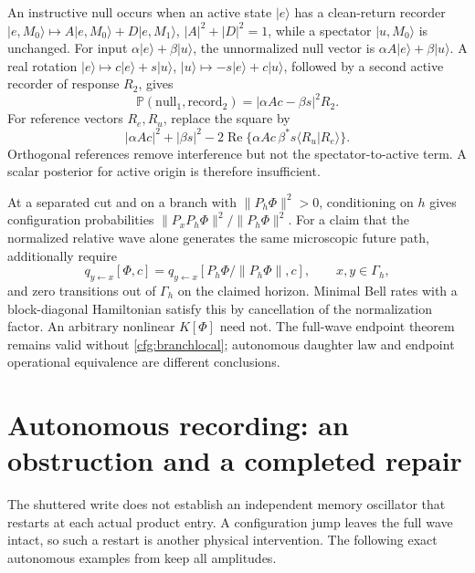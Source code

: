 \documentclass[11pt,oneside,openany]{book}
\theoremstyle{definition}
\theoremstyle{remark}\newtheorem{remark}[theorem]{Remark}
\begin{document}
An instructive null occurs when an active state $|e\rangle$ has a
clean-return recorder
$|e,M_0\rangle\mapsto A|e,M_0\rangle+D|e,M_1\rangle$,
$|A|^2+|D|^2=1$, while a spectator $|u,M_0\rangle$ is unchanged.
For input $\alpha|e\rangle+\beta|u\rangle$, the unnormalized null vector is
$\alpha A|e\rangle+\beta|u\rangle$. A real rotation
$|e\rangle\mapsto c|e\rangle+s|u\rangle$,
$|u\rangle\mapsto-s|e\rangle+c|u\rangle$, followed by a second
active recorder of response $R_2$, gives
\[
 \mathbb P(\mathrm{null}_1,\mathrm{record}_2)
       =|\alpha Ac-\beta s|^2 R_2.
\]
For reference vectors $R_e,R_u$, replace the square by
\[
 |\alpha Ac|^2+|\beta s|^2
 -2\operatorname{Re}\{\alpha Ac\,\beta^*s
                   \langle R_u|R_e\rangle\}.
\]
Orthogonal references remove interference but not the spectator-to-active
term. A scalar posterior for active origin is therefore insufficient.

At a separated cut and on a branch with $\|P_h\Phi\|^2>0$, conditioning on $h$ gives configuration probabilities
$\|P_xP_h\Phi\|^2/\|P_h\Phi\|^2$. For a claim that the normalized relative
wave alone generates the same microscopic future path, additionally require
\begin{equation}
 q_{y\leftarrow x}[\Phi,c]
   =q_{y\leftarrow x}[P_h\Phi/\|P_h\Phi\|,c],
 \qquad x,y\in\Gamma_h,
 \label{cfg:branchlocal}
\end{equation}
and zero transitions out of $\Gamma_h$ on the claimed horizon.
Minimal Bell rates with a block-diagonal Hamiltonian satisfy this by
cancellation of the normalization factor. An arbitrary nonlinear
$K[\Phi]$ need not. The full-wave endpoint theorem remains valid without
\eqref{cfg:branchlocal}; autonomous daughter law and endpoint operational
equivalence are different conclusions.

\section{Autonomous recording: an obstruction and a completed repair}

The shuttered write does not establish an independent memory oscillator
that restarts at each actual product entry. A configuration jump leaves
the full wave intact, so such a restart is another physical intervention.
The following exact autonomous examples from \cite{C02} keep all amplitudes.
\end{document}
